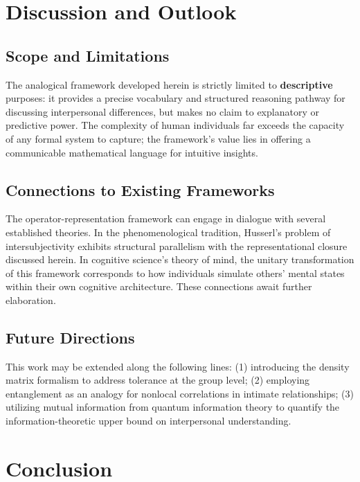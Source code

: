 ﻿\documentclass[11pt,a4paper]{article}
\begin{document}
\section{Discussion and Outlook}

\subsection{Scope and Limitations}

The analogical framework developed herein is strictly limited to \textbf{descriptive} purposes: it provides a precise vocabulary and structured reasoning pathway for discussing interpersonal differences, but makes no claim to explanatory or predictive power. The complexity of human individuals far exceeds the capacity of any formal system to capture; the framework's value lies in offering a communicable mathematical language for intuitive insights.

\subsection{Connections to Existing Frameworks}

The operator-representation framework can engage in dialogue with several established theories. In the phenomenological tradition, Husserl's problem of intersubjectivity exhibits structural parallelism with the representational closure discussed herein. In cognitive science's theory of mind, the unitary transformation of this framework corresponds to how individuals simulate others' mental states within their own cognitive architecture. These connections await further elaboration.

\subsection{Future Directions}

This work may be extended along the following lines: (1) introducing the density matrix formalism to address tolerance at the group level; (2) employing entanglement as an analogy for nonlocal correlations in intimate relationships; (3) utilizing mutual information from quantum information theory to quantify the information-theoretic upper bound on interpersonal understanding.

\section{Conclusion}
\end{document}
